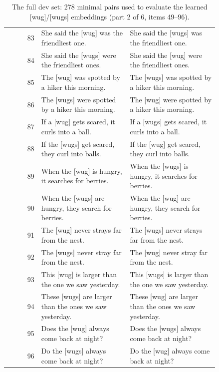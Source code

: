\begin{table}[p]
\begin{tabular}{@{}rp{0.42\linewidth}p{0.42\linewidth}@{}}
83 & She said the {[}wug{]} was the friendliest one. & She said the {[}wugs{]} was the friendliest one. \\
84 & She said the {[}wugs{]} were the friendliest ones. & She said the {[}wug{]} were the friendliest ones. \\
85 & The {[}wug{]} was spotted by a hiker this morning. & The {[}wugs{]} was spotted by a hiker this morning. \\
86 & The {[}wugs{]} were spotted by a hiker this morning. & The {[}wug{]} were spotted by a hiker this morning. \\
87 & If a {[}wug{]} gets scared, it curls into a ball. & If a {[}wugs{]} gets scared, it curls into a ball. \\
88 & If the {[}wugs{]} get scared, they curl into balls. & If the {[}wug{]} get scared, they curl into balls. \\
89 & When the {[}wug{]} is hungry, it searches for berries. & When the {[}wugs{]} is hungry, it searches for berries. \\
90 & When the {[}wugs{]} are hungry, they search for berries. & When the {[}wug{]} are hungry, they search for berries. \\
91 & The {[}wug{]} never strays far from the nest. & The {[}wugs{]} never strays far from the nest. \\
92 & The {[}wugs{]} never stray far from the nest. & The {[}wug{]} never stray far from the nest. \\
93 & This {[}wug{]} is larger than the one we saw yesterday. & This {[}wugs{]} is larger than the one we saw yesterday. \\
94 & These {[}wugs{]} are larger than the ones we saw yesterday. & These {[}wug{]} are larger than the ones we saw yesterday. \\
95 & Does the {[}wug{]} always come back at night? & Does the {[}wugs{]} always come back at night? \\
96 & Do the {[}wugs{]} always come back at night? & Do the {[}wug{]} always come back at night? \\
\hline
\end{tabular}
\caption{The full dev set: 278 minimal pairs used to evaluate the learned {[}wug{]}/{[}wugs{]} embeddings (part 2 of 6, items 49--96).}
\label{tab:dev-set-2}
\end{table}

